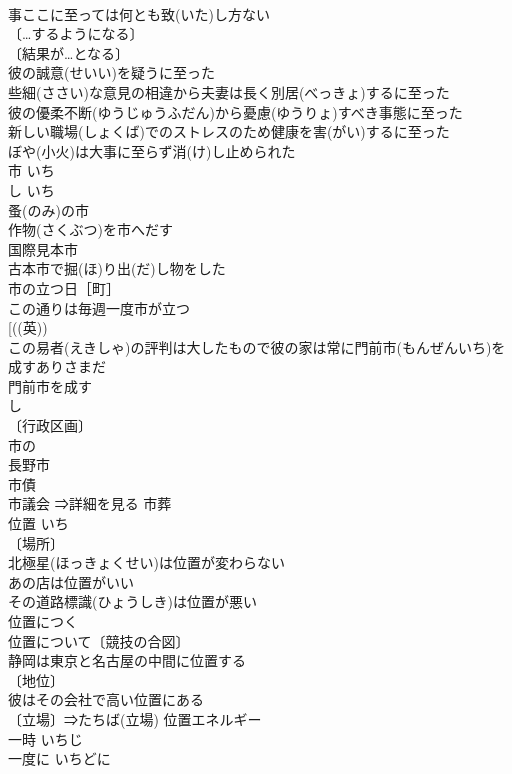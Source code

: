 \documentclass[8pt]{extreport}
\begin{document}
\begin{CJK}{UTF8}{min}
\\	事ここに至っては何とも致(いた)し方ない 
\\	〔…するようになる〕
\\	〔結果が…となる〕
\\	彼の誠意(せいい)を疑うに至った 
\\	些細(ささい)な意見の相違から夫妻は長く別居(べっきょ)するに至った 
\\	彼の優柔不断(ゆうじゅうふだん)から憂慮(ゆうりょ)すべき事態に至った 
\\	新しい職場(しょくば)でのストレスのため健康を害(がい)するに至った 
\\	ぼや(小火)は大事に至らず消(け)し止められた 
\\	市	いち 
\\	し	いち 
\\	蚤(のみ)の市 
\\	作物(さくぶつ)を市へだす 
\\	国際見本市 
\\	古本市で掘(ほ)り出(だ)し物をした 
\\	市の立つ日［町］ 
\\	この通りは毎週一度市が立つ 
\\	[((英)) 
\\	この易者(えきしゃ)の評判は大したもので彼の家は常に門前市(もんぜんいち)を成すありさまだ 
\\	門前市を成す 
\\	し 
\\	〔行政区画〕
\\	市の 
\\	長野市 
\\	市債 
\\	市議会 ⇒詳細を見る 市葬 
\\	位置	いち	
\\	〔場所〕
\\	北極星(ほっきょくせい)は位置が変わらない 
\\	あの店は位置がいい 
\\	その道路標識(ひょうしき)は位置が悪い 
\\	位置につく 
\\	位置について〔競技の合図〕 
\\	静岡は東京と名古屋の中間に位置する 
\\	〔地位〕
\\	彼はその会社で高い位置にある 
\\	〔立場〕⇒たちば(立場) 位置エネルギー 
\\	一時	いちじ	
\\	一度に	いちどに	

\end{CJK}
\end{document}
